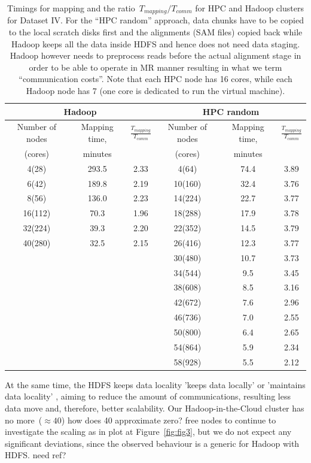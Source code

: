 \documentclass[11pt, oneside]{article}   	%
\newcommand{\COMMENT}[1]{{\color{red} #1 }}
\begin{document}
\begin{table}[htdp]
\caption{Timings  for mapping and the ratio~$T_{mapping}/T_{comm}$ for HPC and Hadoop clusters for Dataset IV.
For the ``HPC random'' approach, data chunks have to be copied to the local scratch disks first and the alignments (SAM files) copied back while Hadoop keeps all the data inside HDFS and hence does not need data staging. Hadoop however needs to preprocess reads before the actual alignment stage in order to be able to operate in MR manner resulting in what we term ``communication costs''. Note that each HPC node has 16 cores, while each Hadoop node has 7 (one core is dedicated to run the virtual machine).}
\begin{center}
\begin{tabular}{|c|c|c|c|c|c|}
 \multicolumn{3}{|c|}{Hadoop} & \multicolumn{3}{c|}{ HPC random} \\
 \hline		


Number of nodes	&Mapping time,	&$\frac{T_{mapping}}{T_{comm}}$	&Number of nodes	&Mapping time,	&$\frac{T_{mapping}}{T_{comm}}$\\
(cores)					&minutes		&							&(cores)			&minutes&\\
\hline
4(28)	&293.5	&2.33	&4(64)	&74.4	&3.89\\
6(42)	&189.8	&2.19	&10(160)	&32.4	&3.76\\
8(56)	&136.0	&2.23	&14(224)	&22.7	&3.77\\
16(112)	&70.3	&1.96	&18(288)	&17.9	&3.78\\
32(224)	&39.3	&2.20	&22(352)	&14.5	&3.79\\
40(280)	&32.5	&2.15	&26(416)	&12.3	&3.77\\
			&&&30(480)	&10.7	&3.73\\
			&&&34(544)	&9.5	&3.45\\
			&&&38(608)	&8.5	&3.16\\
			&&&42(672)	&7.6	&2.96\\
			&&&46(736)	&7.0	&2.55\\
			&&&50(800)	&6.4	&2.65\\
			&&&54(864)	&5.9	&2.34\\
			&&&58(928)	&5.5	&2.12\\

\end{tabular}
\end{center}
\label{table:6}
\end{table}%
 At the same time, the HDFS keeps data locality \COMMENT{'keeps data locally' or 'maintains data locality'}, aiming to reduce the amount of communications, resulting less data move and, therefore, better scalability.
Our Hadoop-in-the-Cloud cluster has no more~($\approx 40$) \COMMENT{how does 40 approximate zero?} free nodes to continue to investigate the scaling as in plot at Figure~\ref{fig:fig3}, but we do not expect any significant deviations, since the observed behaviour is a generic for Hadoop with HDFS. \COMMENT{need ref?}
\end{document}
